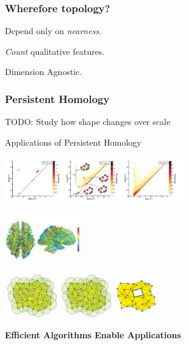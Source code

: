 \begin{frame}
  \frametitle{Wherefore topology? }
  \begin{minipage}{.25\textwidth}
  \end{minipage}
  \begin{minipage}{.65\textwidth}
  \begin{description}
      \item Depend only on \emph{nearness}. 
      \item \emph{Count} qualitative features.
      \item Dimension Agnostic.
      \end{description}
    \end{minipage}
    \vfill
\end{frame}

\begin{frame}
\frametitle{Persistent Homology}
TODO: Study how shape changes over scale
\end{frame}

\begin{frame}{Applications of Persistent Homology}
\begin{center}
\includegraphics[height=2cm]{persistence_and_materials}
\end{center}
\begin{minipage}{.43\textwidth}
\includegraphics[height=2cm]{complex_on_brains}
\end{minipage}
\begin{minipage}{.43\textwidth}
\hfill
\includegraphics[height=2cm]{sensors}
\end{minipage}
\pause
\begin{center}
\textbf{Efficient Algorithms Enable Applications}
\end{center}
\end{frame}

